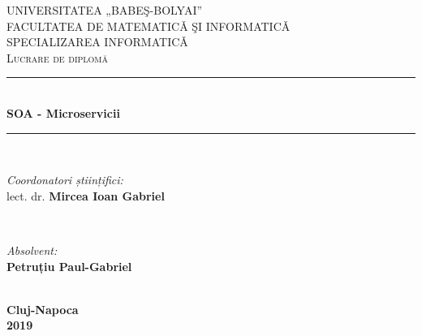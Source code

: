 \documentclass[12pt]{report}
\begin{document}
\begin{titlepage}
 
\newcommand{\HRule}{\rule{\linewidth}{0.5mm}} %
 
\center %
 
 
\textsc{UNIVERSITATEA „BABEŞ-BOLYAI” \\
FACULTATEA DE MATEMATICǍ ŞI INFORMATICǍ \\
SPECIALIZAREA INFORMATICǍ}\\[5cm] %
\textsc{\large Lucrare de diplomă}\\[0.5cm] %
 
 
\HRule \\[0.4cm]
{\LARGE  \bfseries SOA - Microservicii}\\[0.4cm] %
\HRule \\[1.5cm]
 
 
\begin{minipage}{0.4\textwidth}
\begin{flushleft} \large
\emph{Coordonatori științifici:}\\
lect. dr. \textbf{Mircea Ioan Gabriel }
\end{flushleft}
\end{minipage}
~
\begin{minipage}{0.4\textwidth}
\begin{flushright} \large
\emph{Absolvent:} \\
\textbf{Petruțiu Paul-Gabriel} 
\end{flushright}
\end{minipage}\\[6cm]
 
 
{\large \textbf{Cluj-Napoca}}\\[2mm]
{\large \textbf{2019}} %
 
 
\vfill %
 
\end{titlepage}
\end{document}
